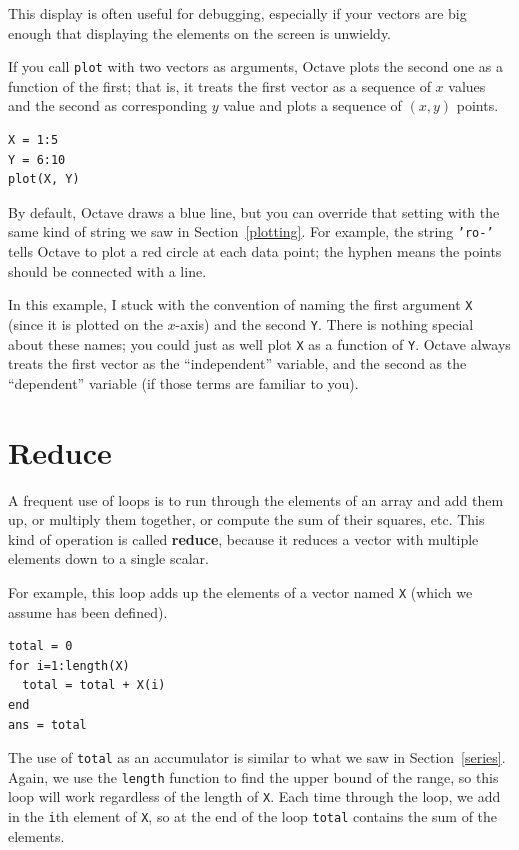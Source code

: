 \documentclass{book}
\begin{document}
This display is often useful for debugging, especially
if your vectors are big enough that displaying the elements on
the screen is unwieldy.

If you call {\tt plot} with two vectors as arguments, Octave plots
the second one as a function of the first; that is, it treats
the first vector as a sequence of $x$ values and the second as
corresponding $y$ value and plots a sequence of $(x, y)$ points.

\begin{verbatim}
X = 1:5
Y = 6:10
plot(X, Y)
\end{verbatim}

By default, Octave draws a blue line, but you can override that
setting with the same kind of string we saw in Section~\ref{plotting}.
For example, the string {\tt 'ro-'} tells Octave to plot a red circle
at each data point; the hyphen means the points should be connected
with a line.

In this example, I stuck with the convention of naming the first
argument {\tt X} (since it is plotted on the $x$-axis) and the
second {\tt Y}. There is nothing special about these names;
you could just as well plot {\tt X} as a function of {\tt Y}.
Octave always treats the first vector as the ``independent''
variable, and the second as the ``dependent'' variable (if those
terms are familiar to you).



\section{Reduce}
\label{reduce}

A frequent use of loops is to run through the elements of an array
and add them up, or multiply them together, or compute the sum
of their squares, etc. This kind of operation is called {\bf reduce},
because it reduces a vector with multiple elements down to a single
scalar.

For example, this loop adds up the elements of a vector named {\tt X}
(which we assume has been defined).

\begin{verbatim}
total = 0
for i=1:length(X)
  total = total + X(i)
end
ans = total
\end{verbatim}

The use of {\tt total} as an accumulator is similar to what we
saw in Section~\ref{series}. Again, we use the {\tt length} function
to find the upper bound of the range, so this loop will work
regardless of the length of {\tt X}.
Each time through the loop, we add
in the {\tt i}th element of {\tt X}, so at the end of the loop
{\tt total} contains the sum of the elements.
\end{document}
